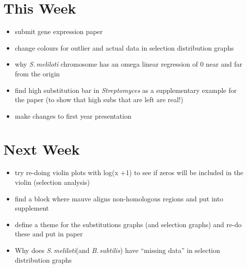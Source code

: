 \documentclass[12pt]{article}
\newcommand{\smel}{\textit{S.\,meliloti}\xspace}
\newcommand{\strep}{\textit{Streptomyces}\xspace}
\newcommand{\bass}{\textit{B.\,subtilis}\xspace}
\begin{document}

\section*{This Week}
%
\begin{itemize}
	\item submit gene expression paper
	\item change colours for outlier and actual data in selection distribution graphs
	\item why \smel chromosome has an omega linear regression of 0 near and far from the origin
	\item find high substitution bar in \strep as a supplementary example for the paper (to show that high subs that are left are real!)
	\item make changes to first year presentation
\end{itemize}


\section*{Next Week}
\begin{itemize}
	\item try re-doing violin plots with log(x +1) to see if zeros will be included in the violin (selection analysis)
	\item find a block where mauve aligns non-homologous regions and put into supplement
	\item define a theme for the substitutions graphs (and selection graphs) and re-do these and put in paper
	\item Why does \smel (and \bass) have ``missing data'' in selection distribution graphs
\end{itemize}
\end{document}
